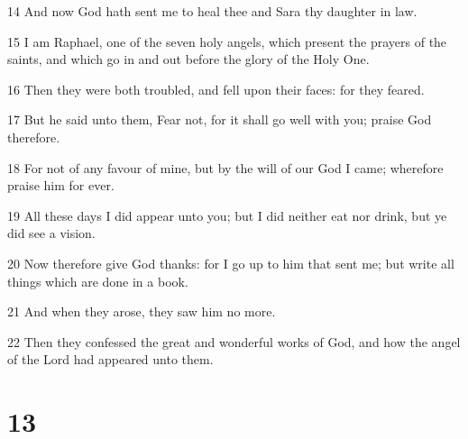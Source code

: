 \par 14 And now God hath sent me to heal thee and Sara thy daughter in law.
\par 15 I am Raphael, one of the seven holy angels, which present the prayers of the saints, and which go in and out before the glory of the Holy One.
\par 16 Then they were both troubled, and fell upon their faces: for they feared.
\par 17 But he said unto them, Fear not, for it shall go well with you; praise God therefore.
\par 18 For not of any favour of mine, but by the will of our God I came; wherefore praise him for ever.
\par 19 All these days I did appear unto you; but I did neither eat nor drink, but ye did see a vision.
\par 20 Now therefore give God thanks: for I go up to him that sent me; but write all things which are done in a book.
\par 21 And when they arose, they saw him no more.
\par 22 Then they confessed the great and wonderful works of God, and how the angel of the Lord had appeared unto them.

\chapter{13}

